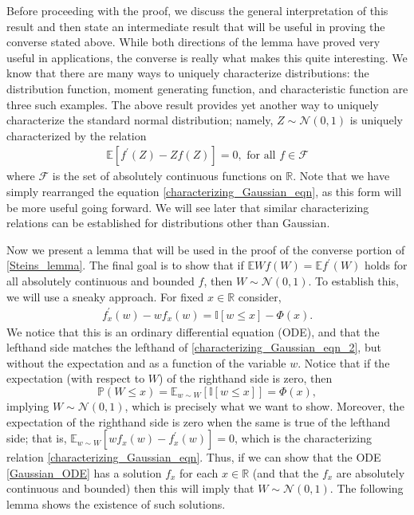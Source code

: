 \documentclass[12pt]{article}
\newcommand{\R}{\mathbb{R}}
\newcommand{\indicator}[1]{\mathbb{I}[#1]}
\newcommand{\E}{\mathbb{E}}
\newcommand{\Prob}{\mathbb{P}}
\newcommand{\Gaussian}{\mathcal{N}}
\newcommand{\GaussianCDF}{\Phi}
\newcommand{\functionSpace}{\mathcal{F}}
\begin{document}
Before proceeding with the proof, we discuss the general interpretation of this result and then state an intermediate result that will be useful in proving the converse stated above. 
While both directions of the lemma have proved very useful in applications, the converse is really what makes this quite interesting. We know that there are many ways to uniquely 
characterize distributions: the distribution function, moment generating function, and characteristic function are three such examples. The above result provides yet another way to 
uniquely characterize the standard normal distribution; namely, $Z \sim \Gaussian(0, 1)$ is uniquely characterized by the relation 
\begin{align}
\E\left[f^\prime(Z) - Z f(Z)\right] = 0, \text{ for all } f \in \functionSpace \label{characterizing_Gaussian_eqn_2}
\end{align}
where $\functionSpace$ is the set of absolutely continuous functions on $\R$. Note that we have simply rearranged the equation \ref{characterizing_Gaussian_eqn}, as this 
form will be more useful going forward. 
We will see later that similar characterizing relations can be established for distributions other than 
Gaussian. 

Now we present a lemma that will be used in the proof of the converse portion of \ref{Steins_lemma}. The final goal is to show that if $\E W f(W) = \E f^\prime(W)$ holds for 
all absolutely continuous and bounded $f$, then $W \sim \Gaussian(0, 1)$. To establish this, we will use a sneaky approach. For fixed $x \in \R$ consider, 
\begin{align}
f_x^\prime(w) - wf_x(w) = \indicator{w \leq x} - \GaussianCDF(x). \label{Gaussian_ODE}
\end{align}
We notice that this is an ordinary differential equation (ODE), and that the lefthand side matches the lefthand of \ref{characterizing_Gaussian_eqn_2}, but without the expectation 
and as a function of the variable $w$. Notice that if the expectation (with respect to $W$) of the righthand side is zero, then 
\[
\Prob(W \leq x) = \E_{w \sim W}[\indicator{w \leq x} ] = \GaussianCDF(x),
\]
implying $W \sim \Gaussian(0, 1)$, which is precisely what we want to show. Moreover, the expectation of the righthand side is zero when the same is true of the 
lefthand side; that is, $\E_{w \sim W}[wf_x(w) - f_x^\prime(w)] = 0$, which is the characterizing relation \ref{characterizing_Gaussian_eqn}. Thus, if we can show that the 
ODE \ref{Gaussian_ODE} has a solution $f_x$ for each $x \in \R$ (and that the $f_x$ are absolutely continuous and bounded) then this will imply that $W \sim \Gaussian(0, 1)$. 
The following lemma shows the existence of such solutions. 
\end{document}
